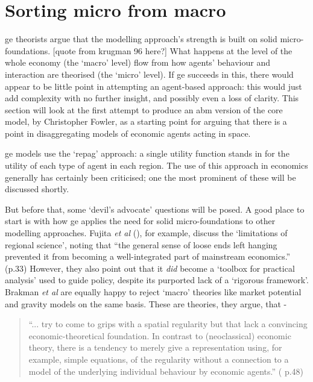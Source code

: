\section{Sorting micro from macro \label{sec:micromacro}}

\gls{ge} theorists argue that the modelling approach's strength is built on solid micro-foundations. [quote from krugman 96 here?] What happens at the level of the whole economy (the `macro' level) flow from how agents' behaviour and interaction are theorised (the `micro' level). If \gls{ge} succeeds in this, there would appear to be little point in attempting an agent-based approach: this would just add complexity with no further insight, and possibly even a loss of clarity. This section will look at the first attempt to produce an \gls{abm} version of the core model, by Christopher Fowler, as a starting point for arguing that there is a point in disaggregating models of economic agents acting in space. 

\gls{ge} models use the `\gls{repag}' approach: a single utility function stands in for the utility of each type of agent in each region. The use of this approach in economics generally has certainly been criticised; one the most prominent of these will be discussed shortly.

But before that, some `devil's advocate' questions will be posed. A good place to start is with how \gls{ge} applies the need for solid micro-foundations to other modelling approaches. Fujita \emph{et al} (\citeyear{fujita_spatial_2001}), for example, discuss the `limitations of regional science', noting that ``the general sense of loose ends left hanging prevented it from becoming a well-integrated part of mainstream economics.'' (p.33) However, they also point out that it \emph{did} become a `toolbox for practical analysis' used to guide policy, despite its purported lack of a `rigorous framework'. Brakman \emph{et al} are equally happy to reject `macro' theories like market potential and gravity models on the same basis. These are theories, they argue, that -

\begin{quote}
``... try to come to grips with a spatial regularity but that lack a convincing economic-theoretical foundation. In contrast to (neoclassical) economic theory, there is a tendency to merely give a representation using, for example, simple equations, of the regularity without a connection to a model of the underlying individual behaviour by economic agents.'' (\citealt{brakman_new_2009}  p.48)
\end{quote}

